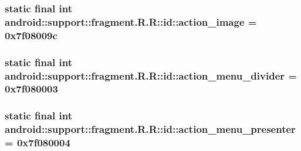 \hypertarget{classandroid_1_1support_1_1fragment_1_1_r_1_1id_9cae1fc883a69da80a438ffe1063c256}{
\subsubsection[{action\_\-image}]{\setlength{\rightskip}{0pt plus 5cm}static final int android::support::fragment.R.R::id::action\_\-image = 0x7f08009c}}
\label{classandroid_1_1support_1_1fragment_1_1_r_1_1id_9cae1fc883a69da80a438ffe1063c256}


\hypertarget{classandroid_1_1support_1_1fragment_1_1_r_1_1id_92cb882f3495b5c78d5cda2efd9ba3cf}{
\subsubsection[{action\_\-menu\_\-divider}]{\setlength{\rightskip}{0pt plus 5cm}static final int android::support::fragment.R.R::id::action\_\-menu\_\-divider = 0x7f080003}}
\label{classandroid_1_1support_1_1fragment_1_1_r_1_1id_92cb882f3495b5c78d5cda2efd9ba3cf}


\hypertarget{classandroid_1_1support_1_1fragment_1_1_r_1_1id_8ed93ec95bd39f0219a07dbd6cc63a33}{
\subsubsection[{action\_\-menu\_\-presenter}]{\setlength{\rightskip}{0pt plus 5cm}static final int android::support::fragment.R.R::id::action\_\-menu\_\-presenter = 0x7f080004}}
\label{classandroid_1_1support_1_1fragment_1_1_r_1_1id_8ed93ec95bd39f0219a07dbd6cc63a33}


